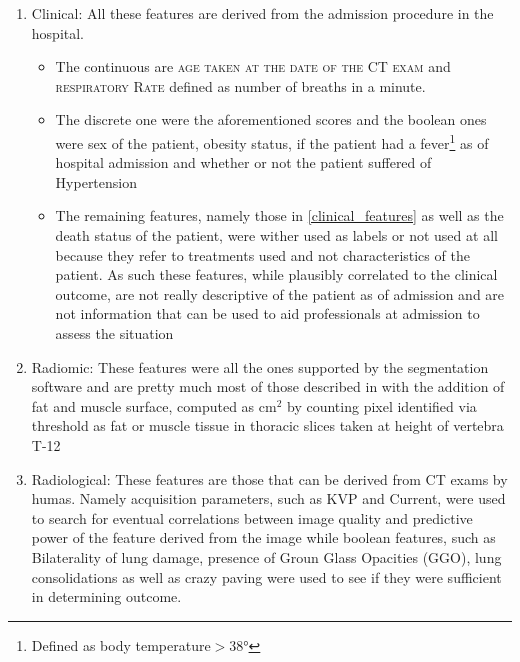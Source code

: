\begin{enumerate}
\item Clinical: All these features are derived from the admission procedure in the hospital.
	\begin{itemize}
        \item The continuous are {\scshape age taken at the date of the CT exam} and {\scshape respiratory Rate} defined as number of breaths in a minute.
		\item The discrete one were the aforementioned scores and the boolean ones were sex of the patient, obesity status, if the patient had a fever\footnote{Defined as body temperature$>$38°} as of hospital admission and whether or not the patient suffered of Hypertension
		\item The remaining features, namely those in \ref{clinical_features} as well as the death status of the patient, were wither used as labels or not used at all because they refer to treatments used and not characteristics of the patient. As such these features, while plausibly correlated to the clinical outcome, are not really descriptive of the patient as of admission and are not information that can be used to aid professionals at admission to assess the situation
	\end{itemize}
\item Radiomic: These features were all the ones supported by the segmentation software and are pretty much most of those described in \cite{IBSI} with the addition of fat and muscle surface, computed as cm$^2$ by counting pixel identified via threshold as fat or muscle tissue in thoracic slices taken at height of vertebra T-12
\item Radiological: These features are those that can be derived from CT exams by humas. Namely acquisition parameters, such as KVP and Current, were used to search for eventual correlations between image quality and predictive power of the feature derived from the image while boolean features, such as Bilaterality of lung damage, presence of Groun Glass Opacities (GGO), lung consolidations as well as crazy paving were used to see if they were sufficient in determining outcome.
\end{enumerate}

